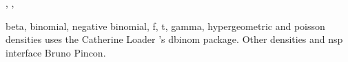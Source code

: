 


\begin{manseealso}
  , ,   
\end{manseealso}


\begin{authors}
  beta, binomial, negative binomial, f, t, gamma, hypergeometric and 
  poisson densities uses the Catherine Loader 's dbinom package. Other 
  densities and nsp interface Bruno Pincon.
\end{authors}

